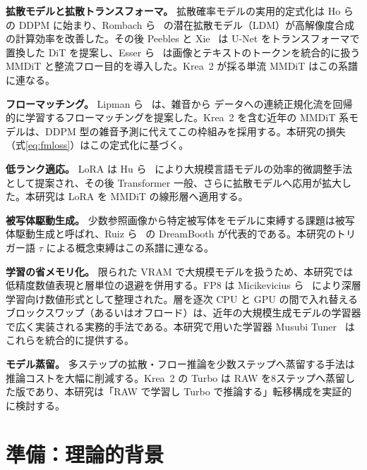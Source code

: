 \documentclass[10pt,twocolumn]{ltjsarticle}
\begin{document}
\textbf{拡散モデルと拡散トランスフォーマ。} 拡散確率モデルの実用的定式化は Ho ら~\cite{ho2020ddpm} の DDPM に始まり、Rombach ら~\cite{rombach2022ldm} の潜在拡散モデル（LDM）が高解像度合成の計算効率を改善した。その後 Peebles と Xie~\cite{peebles2023dit} は U-Net をトランスフォーマで置換した DiT を提案し、Esser ら~\cite{esser2024sd3} は画像とテキストのトークンを統合的に扱う MMDiT と整流フロー目的を導入した。Krea~2 が採る単流 MMDiT はこの系譜に連なる。

\textbf{フローマッチング。} Lipman ら~\cite{lipman2023flowmatching} は、雑音から データへの連続正規化流を回帰的に学習するフローマッチングを提案した。Krea~2 を含む近年の MMDiT 系モデルは、DDPM 型の雑音予測に代えてこの枠組みを採用する。本研究の損失（式\eqref{eq:fmloss}）はこの定式化に基づく。

\textbf{低ランク適応。} LoRA は Hu ら~\cite{hu2022lora} により大規模言語モデルの効率的微調整手法として提案され、その後 Transformer 一般、さらに拡散モデルへ応用が拡大した。本研究は LoRA を MMDiT の線形層へ適用する。

\textbf{被写体駆動生成。} 少数参照画像から特定被写体をモデルに束縛する課題は被写体駆動生成と呼ばれ、Ruiz ら~\cite{ruiz2023dreambooth} の DreamBooth が代表的である。本研究のトリガー語 $\tau$ による概念束縛はこの系譜に連なる。

\textbf{学習の省メモリ化。} 限られた VRAM で大規模モデルを扱うため、本研究では低精度数値表現と層単位の退避を併用する。FP8 は Micikevicius ら~\cite{micikevicius2022fp8} により深層学習向け数値形式として整理された。層を逐次 CPU と GPU の間で入れ替えるブロックスワップ（あるいはオフロード）は、近年の大規模生成モデルの学習器で広く実装される実務的手法である。本研究で用いた学習器 Musubi Tuner~\cite{musubi2026} はこれらを統合的に提供する。

\textbf{モデル蒸留。} 多ステップの拡散・フロー推論を少数ステップへ蒸留する手法は推論コストを大幅に削減する。Krea~2 の Turbo は RAW を8ステップへ蒸留した版であり、本研究は「RAW で学習し Turbo で推論する」転移構成を実証的に検討する。

\section{準備：理論的背景}
\end{document}
